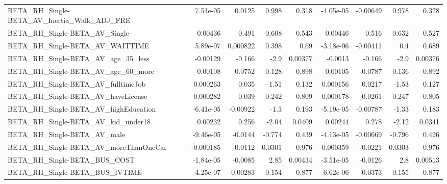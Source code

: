 \begin{tabular}{lrrrrrrrr}
BETA\_RH\_Single-BETA\_AV\_Inertia\_Walk\_ADJ\_FRE        &    7.51e-05 &       0.0125 &    0.998 &    0.318 &  -4.05e-05 &    -0.00649 &        0.978 &         0.328 \\
BETA\_RH\_Single-BETA\_AV\_Single                      &     0.00436 &        0.491 &    0.608 &    0.543 &    0.00446 &       0.516 &        0.632 &         0.527 \\
BETA\_RH\_Single-BETA\_AV\_WAITTIME                    &    5.89e-07 &     0.000822 &    0.398 &     0.69 &  -3.18e-06 &    -0.00411 &          0.4 &         0.689 \\
BETA\_RH\_Single-BETA\_AV\_age\_35\_less                 &    -0.00129 &       -0.166 &     -2.9 &  0.00377 &    -0.0013 &      -0.166 &         -2.9 &       0.00376 \\
BETA\_RH\_Single-BETA\_AV\_age\_60\_more                 &     0.00108 &       0.0752 &    0.128 &    0.898 &    0.00105 &      0.0787 &        0.136 &         0.892 \\
BETA\_RH\_Single-BETA\_AV\_fulltimeJob                 &    0.000263 &        0.035 &    -1.51 &    0.132 &   0.000156 &      0.0217 &        -1.53 &         0.127 \\
BETA\_RH\_Single-BETA\_AV\_haveLicense                 &    0.000282 &        0.039 &    0.242 &    0.809 &   0.000178 &      0.0261 &        0.247 &         0.805 \\
BETA\_RH\_Single-BETA\_AV\_highEducation               &   -6.41e-05 &     -0.00922 &     -1.3 &    0.193 &  -5.19e-05 &    -0.00787 &        -1.33 &         0.183 \\
BETA\_RH\_Single-BETA\_AV\_kid\_under18                 &     0.00232 &        0.256 &    -2.04 &   0.0409 &    0.00244 &       0.278 &        -2.12 &        0.0341 \\
BETA\_RH\_Single-BETA\_AV\_male                        &   -9.46e-05 &      -0.0144 &   -0.774 &    0.439 &  -4.13e-05 &    -0.00669 &       -0.796 &         0.426 \\
BETA\_RH\_Single-BETA\_AV\_moreThanOneCar              &   -0.000185 &      -0.0112 &   0.0301 &    0.976 &  -0.000359 &     -0.0221 &       0.0303 &         0.976 \\
BETA\_RH\_Single-BETA\_BUS\_COST                       &   -1.84e-05 &      -0.0085 &     2.85 &  0.00434 &  -3.51e-05 &     -0.0126 &          2.8 &       0.00513 \\
BETA\_RH\_Single-BETA\_BUS\_IVTIME                     &   -4.25e-07 &     -0.00283 &    0.154 &    0.877 &  -6.62e-06 &     -0.0373 &        0.155 &         0.877 \\

\end{tabular}
